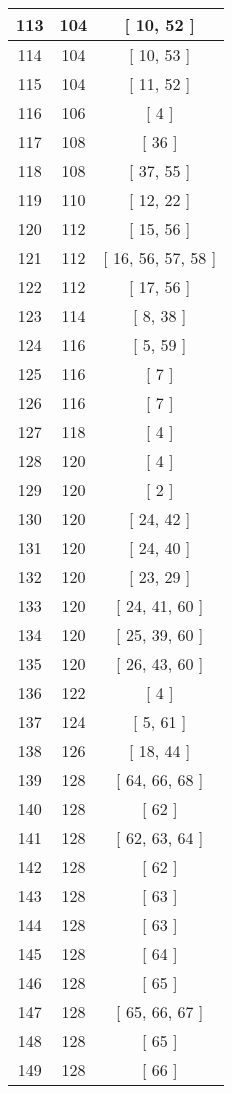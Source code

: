 \begin{center}
\begin{longtable}[H]{|| c c c ||}
113 & 104 & [ 10, 52 ]
\\\hline
114 & 104 & [ 10, 53 ]
\\\hline
115 & 104 & [ 11, 52 ]
\\\hline
116 & 106 & [ 4 ]
\\\hline
117 & 108 & [ 36 ]
\\\hline
118 & 108 & [ 37, 55 ]
\\\hline
119 & 110 & [ 12, 22 ]
\\\hline
120 & 112 & [ 15, 56 ]
\\\hline
121 & 112 & [ 16, 56, 57, 58 ]
\\\hline
122 & 112 & [ 17, 56 ]
\\\hline
123 & 114 & [ 8, 38 ]
\\\hline
124 & 116 & [ 5, 59 ]
\\\hline
125 & 116 & [ 7 ]
\\\hline
126 & 116 & [ 7 ]
\\\hline
127 & 118 & [ 4 ]
\\\hline
128 & 120 & [ 4 ]
\\\hline
129 & 120 & [ 2 ]
\\\hline
130 & 120 & [ 24, 42 ]
\\\hline
131 & 120 & [ 24, 40 ]
\\\hline
132 & 120 & [ 23, 29 ]
\\\hline
133 & 120 & [ 24, 41, 60 ]
\\\hline
134 & 120 & [ 25, 39, 60 ]
\\\hline
135 & 120 & [ 26, 43, 60 ]
\\\hline
136 & 122 & [ 4 ]
\\\hline
137 & 124 & [ 5, 61 ]
\\\hline
138 & 126 & [ 18, 44 ]
\\\hline
139 & 128 & [ 64, 66, 68 ]
\\\hline
140 & 128 & [ 62 ]
\\\hline
141 & 128 & [ 62, 63, 64 ]
\\\hline
142 & 128 & [ 62 ]
\\\hline
143 & 128 & [ 63 ]
\\\hline
144 & 128 & [ 63 ]
\\\hline
145 & 128 & [ 64 ]
\\\hline
146 & 128 & [ 65 ]
\\\hline
147 & 128 & [ 65, 66, 67 ]
\\\hline
148 & 128 & [ 65 ]
\\\hline
149 & 128 & [ 66 ]
\\\hline

\end{longtable}
\end{center}
